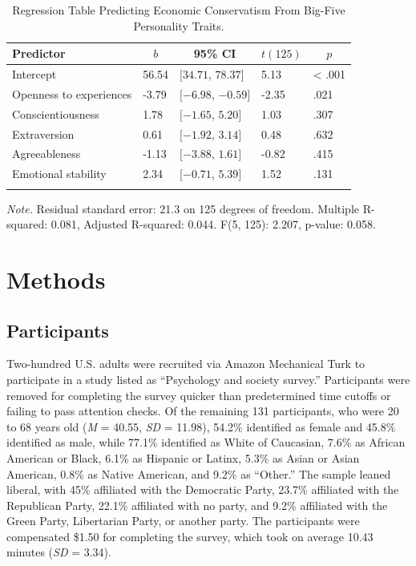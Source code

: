 \documentclass[man]{apa6}
\begin{document}
\begin{table}[tbp]
\begin{center}
\begin{threeparttable}
\caption{\label{tab:linearmodels_conservatism_ocean_tables}Regression Table Predicting Economic Conservatism From Big-Five Personality Traits.}
\begin{tabular}{lllll}
\toprule
Predictor & \multicolumn{1}{c}{$b$} & \multicolumn{1}{c}{95\% CI} & \multicolumn{1}{c}{$t(125)$} & \multicolumn{1}{c}{$p$}\\
\midrule
Intercept & 56.54 & $[34.71$, $78.37]$ & 5.13 & < .001\\
Openness to experiences & -3.79 & $[-6.98$, $-0.59]$ & -2.35 & .021\\
Conscientiousness & 1.78 & $[-1.65$, $5.20]$ & 1.03 & .307\\
Extraversion & 0.61 & $[-1.92$, $3.14]$ & 0.48 & .632\\
Agreeableness & -1.13 & $[-3.88$, $1.61]$ & -0.82 & .415\\
Emotional stability & 2.34 & $[-0.71$, $5.39]$ & 1.52 & .131\\
\bottomrule
\addlinespace
\end{tabular}
\begin{tablenotes}[para]
\normalsize{\textit{Note.} Residual standard error: 21.3 on 125 degrees of freedom. Multiple R-squared: 0.081, Adjusted R-squared: 0.044. F(5, 125): 2.207, p-value: 0.058.}
\end{tablenotes}
\end{threeparttable}
\end{center}
\end{table}

\hypertarget{methods}{%
\section{Methods}\label{methods}}

\hypertarget{participants}{%
\subsection{Participants}\label{participants}}

Two-hundred U.S. adults were recruited via Amazon Mechanical Turk to participate in a study listed as \enquote{Psychology and society survey.} Participants were removed for completing the survey quicker than predetermined time cutoffs or failing to pass attention checks. Of the remaining 131 participants, who were 20 to 68 years old (\emph{M} = 40.55, \emph{SD} = 11.98), 54.2\% identified as female and 45.8\% identified as male, while 77.1\% identified as White of Caucasian, 7.6\% as African American or Black, 6.1\% as Hispanic or Latinx, 5.3\% as Asian or Asian American, 0.8\% as Native American, and 9.2\% as \enquote{Other.} The sample leaned liberal, with 45\% affiliated with the Democratic Party, 23.7\% affiliated with the Republican Party, 22.1\% affiliated with no party, and 9.2\% affiliated with the Green Party, Libertarian Party, or another party. The participants were compensated \$1.50 for completing the survey, which took on average 10.43 minutes (\emph{SD} = 3.34).
\end{document}
